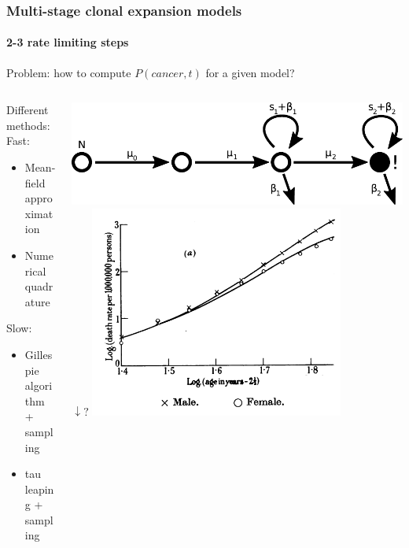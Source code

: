 \documentclass{beamer}
\begin{document}

\begin{frame}
    \frametitle{Multi-stage clonal expansion models}
    \framesubtitle{2-3 rate limiting steps\footnotemark[123]}
    Problem: how to compute $P(cancer, t)$ for a given model?

    \begin{columns}
        \begin{column}{0.5\textwidth}
        \begin{center}
        \end{center}
        Different methods:
        Fast:
        \begin{itemize}
            \item Mean-field approximation\footnotemark[1]
            \item Numerical quadrature\footnotemark[2]
        \end{itemize}
        Slow:
        \begin{itemize}
            \item Gillespie algorithm + sampling \footnotemark[3]
            \item tau leaping + sampling \footnotemark[3]
        \end{itemize}
        \end{column}
        \begin{column}{0.5\textwidth}
        \begin{center}
            \includegraphics[width=1.00\textwidth]{figures/diagram3}
            $\downarrow?$
            \includegraphics[width=0.75\textwidth]{figures/ArmitageDoll1957_4A.png}
        \end{center}
        \end{column}
    \end{columns}


\end{frame}
\end{document}
